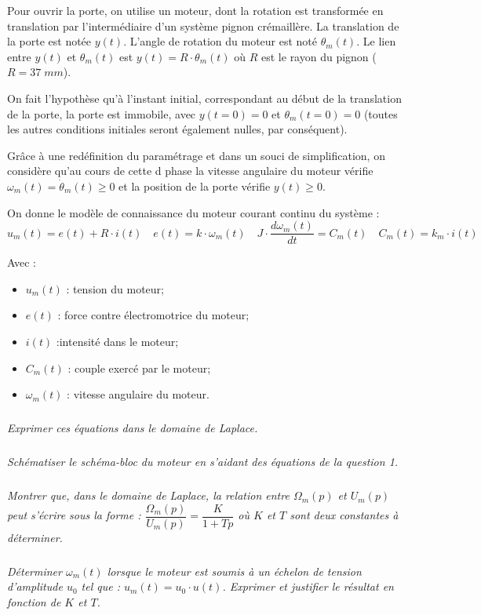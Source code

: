 \documentclass[10pt]{article}
\begin{document}
Pour ouvrir la porte, on utilise un moteur, dont la rotation est transformée en translation par l'intermédiaire d'un système pignon crémaillère. La translation de la porte est notée $y(t)$. L'angle de rotation du moteur est noté $\theta_m(t)$. Le lien entre $y(t)$ et $\theta_m (t)$ est $y(t) = R\cdot\theta_m (t)$ où $R$ est le rayon du pignon ($R=37\; mm$).

On fait l'hypothèse qu'à l'instant initial, correspondant au début de la translation de la porte, la porte est immobile, avec $y(t=0)=0$ et $\theta_m (t=0)=0$ (toutes les autres conditions initiales seront également nulles, par conséquent).

Grâce à une redéfinition du paramétrage et dans un souci de simplification, on considère qu'au cours de cette d phase la vitesse angulaire du moteur vérifie $\omega_m (t) = \dot{\theta}_m (t) \geq 0$ et la position de la porte vérifie $y(t) \geq 0$.  


On donne le modèle de connaissance du moteur courant continu du système :
$$u_m(t) = e(t) + R\cdot i(t) 
\quad e(t) = k\cdot \omega_m(t) 
\quad J\cdot \dfrac{d\omega_m(t)}{dt} = C_m (t)
\quad C_m (t) = k_m \cdot i(t)$$

Avec : 
\begin{itemize}
\item $u_m (t)$ : tension du moteur; 
\item $e(t)$ : force contre électromotrice du moteur; 
\item $i(t)$ :intensité dans le moteur;
\item $C_m (t)$ : couple exercé par le moteur;
\item $\omega_m(t)$ : vitesse angulaire du moteur.
\end{itemize}


\subparagraph{}
\textit{Exprimer ces équations dans le domaine de Laplace.}

\subparagraph{}
\textit{Schématiser le schéma-bloc du moteur en s’aidant des équations de la question 1.}

\subparagraph{}
\textit{Montrer que, dans le domaine de Laplace, la relation entre $\Omega_m (p)$ et $U_m (p)$ peut s'écrire sous la forme : $\dfrac{\Omega_m(p)}{U_m(p)} = \dfrac{K}{1+Tp} $ où $K$ et $T$ sont deux constantes à déterminer.}

\subparagraph{}
\textit{Déterminer $\omega_m (t)$ lorsque le moteur est soumis à un échelon de tension d'amplitude $u_0$ tel que : $u_m (t)= u_0 \cdot u(t)$. Exprimer et justifier le résultat en fonction de $K$ et $T$.}
\end{document}
